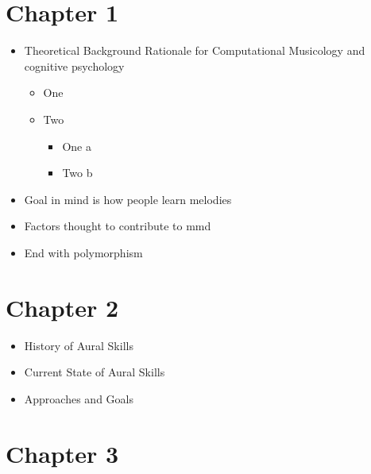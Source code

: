 \documentclass[]{book}
\providecommand{\tightlist}{%
  \setlength{\itemsep}{0pt}\setlength{\parskip}{0pt}}
\theoremstyle{definition}
\theoremstyle{definition}
\theoremstyle{definition}
\theoremstyle{remark}
\begin{document}
\hypertarget{chapter-1}{%
\section{Chapter 1}\label{chapter-1}}

\begin{itemize}
\tightlist
\item
  Theoretical Background Rationale for Computational Musicology and
  cognitive psychology

  \begin{itemize}
  \tightlist
  \item
    One
  \item
    Two

    \begin{itemize}
    \tightlist
    \item
      One a
    \item
      Two b
    \end{itemize}
  \end{itemize}
\item
  Goal in mind is how people learn melodies
\item
  Factors thought to contribute to mmd
\item
  End with polymorphism
\end{itemize}

\hypertarget{chapter-2}{%
\section{Chapter 2}\label{chapter-2}}

\begin{itemize}
\tightlist
\item
  History of Aural Skills
\item
  Current State of Aural Skills
\item
  Approaches and Goals
\end{itemize}

\hypertarget{chapter-3}{%
\section{Chapter 3}\label{chapter-3}}
\end{document}
